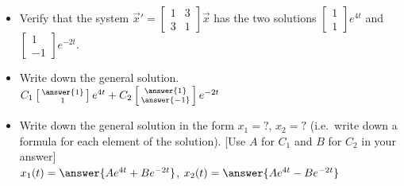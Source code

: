 \documentclass{ximera}
\begin{document}
\begin{exercise}
    
    \begin{itemize}
        \item Verify that the system ${\vec{x}}' =
            \left[ 
                \begin{smallmatrix}
                    1 & 3 \\ 
                    3 & 1
                \end{smallmatrix} 
            \right] 
            \vec{x}$ has the two solutions
            $\left[ 
                \begin{smallmatrix}
                    1 \\ 
                    1
                \end{smallmatrix} 
            \right] e^{4t}$ and
            $\left[ 
                \begin{smallmatrix}
                    1 \\ 
                    -1
                \end{smallmatrix} 
            \right] 
            e^{-2t}$.
        \item Write down the general solution.\\
        $C_1\left[\begin{smallmatrix} \answer{1} \\ 1 \end{smallmatrix}\right]e^{4t} + C_2\left[\begin{smallmatrix} \answer{1} \\ \answer{-1} \end{smallmatrix}\right]e^{-2t}$
        \item Write down the general solution in the form $x_1 = ?$, $x_2 = ?$ (i.e.\ write down a formula for each element of the solution). [Use $A$ for $C_1$ and $B$ for $C_2$ in your answer]\\
        $x_1(t) = \answer{Ae^{4t} + Be^{-2t}}$, $x_2(t) = \answer{Ae^{4t} - Be^{-2t}}$
    \end{itemize}
\end{exercise}
\end{document}
